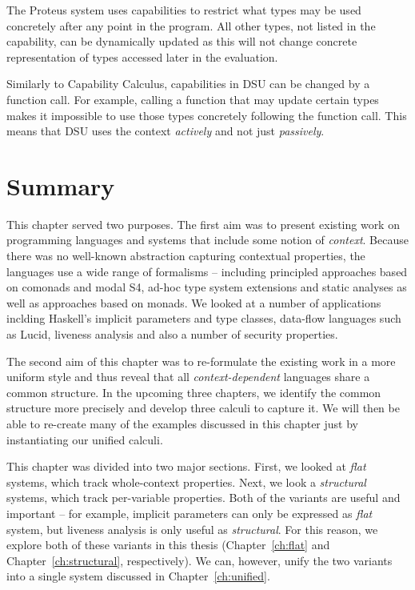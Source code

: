 The Proteus system uses capabilities to restrict what types may be used concretely after any point
in the program. All other types, not listed in the capability, can be dynamically updated as this
will not change concrete representation of types accessed later in the evaluation.

Similarly to Capability Calculus, capabilities in DSU can be changed by a function call. For 
example, calling a function that may update certain types makes it impossible to use those types
concretely following the function call. This means that DSU uses the context \emph{actively}
and not just \emph{passively}.


\section{Summary}

This chapter served two purposes. The first aim was to present existing work on programming 
languages and systems that include some notion of \emph{context}. Because there was no well-known
abstraction capturing contextual properties, the languages use a wide range of formalisms -- including
principled approaches based on comonads and modal S4, ad-hoc type system extensions and static analyses 
as well as approaches based on monads. We looked at a number of applications inclding Haskell's implicit 
parameters and type classes, data-flow languages such as Lucid, liveness analysis and also a number of 
security properties. 

The second aim of this chapter was to re-formulate the existing work in a more uniform style and thus
reveal that all \emph{context-dependent} languages share a common structure. In the upcoming three 
chapters, we identify the common structure more precisely and develop three calculi to capture it. We 
will then be able to re-create many of the examples discussed in this chapter just by instantiating our 
unified calculi.

This chapter was divided into two major sections. First, we looked at \emph{flat} systems, which
track whole-context properties. Next, we look a \emph{structural} systems, which track per-variable
properties. Both of the variants are useful and important -- for example, implicit parameters can
only be expressed as \emph{flat} system, but liveness analysis is only useful as \emph{structural}.
For this reason, we explore both of these variants in this thesis (Chapter~\ref{ch:flat} and 
Chapter~\ref{ch:structural}, respectively). We can, however, unify the two variants into a single
system discussed in Chapter~\ref{ch:unified}.
